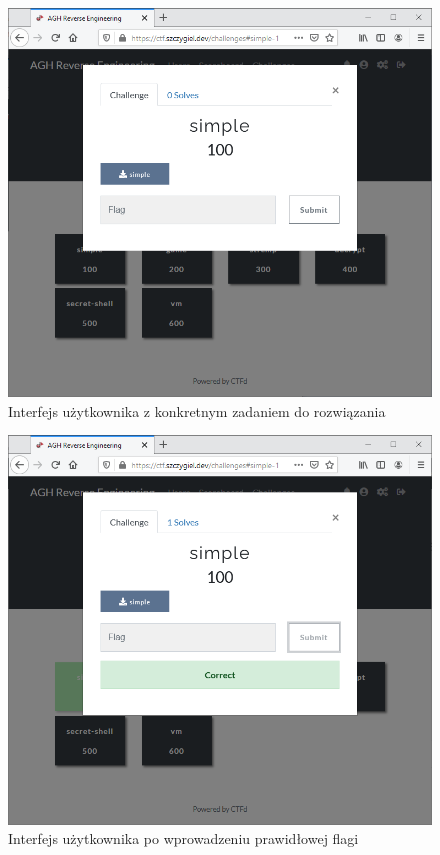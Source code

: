 \documentclass[language=polish,type=eng]{aghmodern}
\begin{document}
\begin{figure}[H]
\centering
\includegraphics[width=\textwidth]{ui_download}
\caption{Interfejs użytkownika z konkretnym zadaniem do rozwiązania}
\end{figure}

\begin{figure}[H]
\centering
\includegraphics[width=\textwidth]{ui_solved}
\caption{Interfejs użytkownika po wprowadzeniu prawidłowej flagi}
\end{figure}
\end{document}
